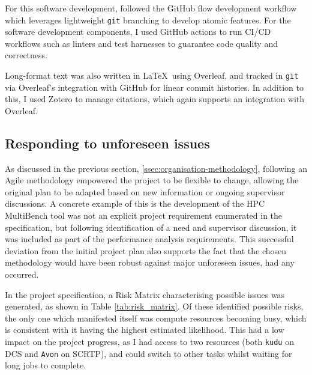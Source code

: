 For this software development, followed the GitHub flow development workflow \cite{GitHubFlow} which leverages lightweight \texttt{git} branching to develop atomic features. For the software development components, I used GitHub actions to run CI/CD workflows \cite{WhatCICD} such as linters and test harnesses to guarantee code quality and correctness.


Long-format text was also written in \LaTeX\ using Overleaf\cite{OverleafOnlineLaTeX}, and tracked in \texttt{git} via Overleaf's integration with GitHub for linear commit histories. In addition to this, I used Zotero \cite{ZoteroYourPersonal} to manage citations, which again supports an integration with Overleaf.


\subsection{Responding to unforeseen issues}
\label{ssec:organisation-unforeseen-issues}

As discussed in the previous section, \ref{ssec:organisation-methodology}, following an Agile methodology empowered the project to be flexible to change, allowing the original plan to be adapted based on new information or ongoing supervisor discussions. A concrete example of this is the development of the HPC MultiBench tool was not an explicit project requirement enumerated in the specification, but following identification of a need and supervisor discussion, it was included as part of the performance analysis requirements. This successful deviation from the initial project plan also supports the fact that the chosen methodology would have been robust against major unforeseen issues, had any occurred.

In the project specification, a Risk Matrix characterising possible issues was generated, as shown in Table \ref{tab:risk_matrix}.
Of these identified possible risks, the only one which manifested itself was compute resources becoming busy, which is consistent with it having the highest estimated likelihood. This had a low impact on the project progress, as I had access to two resources (both \texttt{kudu} on DCS and \texttt{Avon} on SCRTP), and could switch to other tasks whilst waiting for long jobs to complete.


